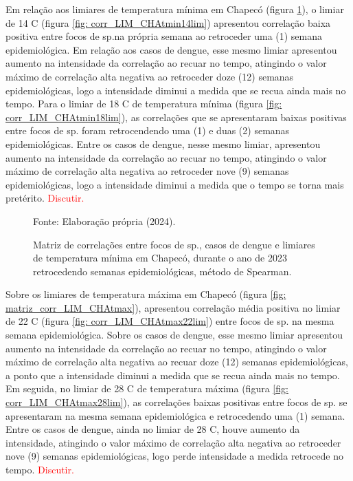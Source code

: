\documentclass[
	12pt,				%
	openright,			%
	oneside,			%
	a4paper,			%
	english,			%
	french,				%
	spanish,			%
	brazil				%
	dvipsnames, table]{abntex2}
\begin{document}
\indent Em relação aos limiares de temperatura mínima em Chapecó (figura \ref{fig: matriz_corr_LIM_CHAtmin}), o limiar de 14 C (figura \ref{fig: corr_LIM_CHAtmin14lim}) apresentou correlação baixa positiva entre focos de  sp.na própria semana ao retroceder uma (1) semana epidemiológica. Em relação aos casos de dengue, esse mesmo limiar apresentou aumento na intensidade da correlação ao recuar no tempo, atingindo o valor máximo de correlação alta negativa ao retroceder doze (12) semanas epidemiológicas, logo a intensidade diminui a medida que se recua ainda mais no tempo. Para o limiar de 18 C de temperatura mínima (figura \ref{fig: corr_LIM_CHAtmin18lim}), as correlações que se apresentaram baixas positivas entre focos de  sp. foram retrocendendo uma (1) e duas (2) semanas epidemiológicas. Entre os casos de dengue, nesse mesmo limiar, apresentou aumento na intensidade da correlação ao recuar no tempo, atingindo o valor máximo de correlação alta negativa ao retroceder nove (9) semanas epidemiológicas, logo a intensidade diminui a medida que o tempo se torna mais pretérito. \textcolor{red}{Discutir.}

\begin{figure}[htbp]
    \begin{center}
    \caption{Matriz de correlações entre focos de  sp., casos de dengue e limiares de temperatura mínima em Chapecó, durante o ano de 2023 retrocedendo semanas epidemiológicas, método de Spearman.}
    \label{fig: matriz_corr_LIM_CHAtmin}
        \hfill
    \end{center}
    \small{Fonte: Elaboração própria (2024).}
\end{figure}

\indent Sobre os limiares de temperatura máxima em Chapecó (figura \ref{fig: matriz_corr_LIM_CHAtmax}), apresentou correlação média positiva no limiar de 22 C (figura \ref{fig: corr_LIM_CHAtmax22lim}) entre focos de  sp. na mesma semana epidemiológica. Sobre os casos de dengue, esse mesmo limiar apresentou aumento na intensidade da correlação ao recuar no tempo, atingindo o valor máximo de correlação alta negativa ao recuar doze (12) semanas epidemiológicas, a ponto que a intensidade diminui a medida que se recua ainda mais no tempo. Em seguida, no limiar de 28 C de temperatura máxima (figura \ref{fig: corr_LIM_CHAtmax28lim}), as correlações baixas positivas entre focos de  sp. se apresentaram na mesma semana epidemiológica e retrocedendo uma (1) semana. Entre os casos de dengue, ainda no limiar de 28 C, houve aumento da intensidade, atingindo o valor máximo de correlação alta negativa ao retroceder nove (9) semanas epidemiológicas, logo perde intensidade a medida retrocede no tempo. \textcolor{red}{Discutir.}
\end{document}
